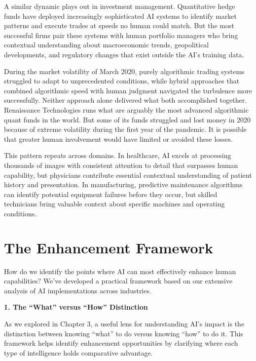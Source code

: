 \documentclass[
  Letterpaper,
]{scrbook}
\begin{document}
A similar dynamic plays out in investment
management. Quantitative hedge funds have
deployed increasingly sophisticated AI systems to identify market
patterns and execute trades at speeds no human could match. But the most
successful firms pair these systems with human portfolio managers who
bring contextual understanding about macroeconomic trends, geopolitical
developments, and regulatory changes that exist outside the AI's
training data.

During the market volatility of March 2020, purely algorithmic trading
systems struggled to adapt to unprecedented conditions, while hybrid
approaches that combined algorithmic speed with human
judgment navigated the
turbulence more successfully. Neither approach alone delivered what both
accomplished together. Renaissance Technologies runs what are arguably
the most advanced algorithmic quant funds in the world. But some of its
funds struggled and lost money in 2020 because of extreme volatility
during the first year of the pandemic. It is possible that greater human
involvement would have limited or avoided these losses.

This pattern repeats across domains. In healthcare, AI
excels at processing thousands of images with consistent attention to
detail that surpasses human capability, but physicians contribute
essential contextual understanding of patient history and presentation.
In manufacturing, predictive maintenance
algorithms can identify potential
equipment failures before they occur, but skilled technicians bring
valuable context about specific machines and operating conditions.

\section{\texorpdfstring{The Enhancement
Framework}{The Enhancement Framework}}\label{the-enhancement-framework}

How do we identify the points where AI can most effectively enhance
human capabilities?
We've developed a practical framework based on our extensive analysis of
AI implementations across industries.

\textbf{1. The ``What'' versus ``How'' Distinction}

As we explored in Chapter 3, a useful lens for understanding AI's impact
is the distinction between knowing ``what'' to do versus knowing ``how''
to do it. This framework helps identify enhancement opportunities by
clarifying where each type of intelligence holds comparative advantage.
\end{document}
